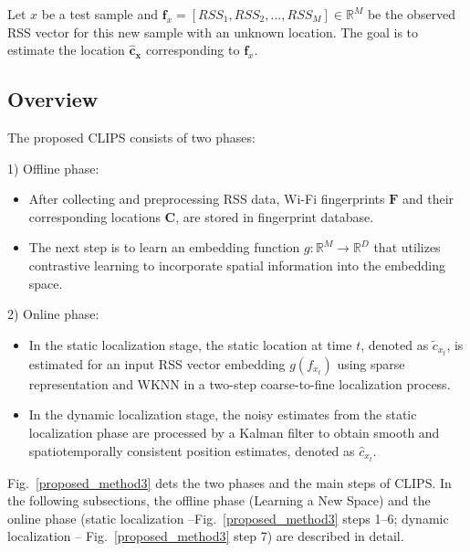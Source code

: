 \documentclass[journal,twoside,web]{ieeecolor}
\begin{document}
Let $x$ be a test sample and $\mathbf{f}_{x}= [RSS_1, RSS_2, ..., RSS_M] \in \mathbb{R}^{M}$ be the observed RSS vector for this new sample with an unknown location.
The goal is to estimate the location $\mathbf{\hat{c}_x}$ corresponding to $\mathbf{f}_{x}$.
\subsection{Overview}
The proposed CLIPS consists of two
phases:

1) Offline phase: 
\begin{itemize}
    \item After collecting and preprocessing RSS data, Wi-Fi fingerprints  
    \(\mathbf{F}\)  
    and their corresponding locations 
    \(\mathbf{C} \), are stored in fingerprint database.
    \item The next step is to learn an embedding function \( g: \mathbb{R}^M \to \mathbb{R}^D \) that utilizes contrastive learning to incorporate spatial information into the embedding space.
\end{itemize}
2) Online phase:
\begin{itemize}
    \item In the static localization stage, the static location at time \( t \), denoted as \( \tilde{c}_{x_t} \), is estimated for an input RSS vector embedding \( g(f_{x_t}) \) using sparse representation and WKNN in a two-step coarse-to-fine localization process.
    \item In the dynamic localization stage, the noisy estimates from the static localization phase are processed by a Kalman filter to obtain smooth and spatiotemporally consistent position estimates, denoted as \( \hat{c}_{x_t} \).
\end{itemize}
Fig.~\ref{proposed_method3} dets the
two phases and the main steps of CLIPS. In the following subsections, the offline phase (Learning a New Space) and the online phase (static localization –Fig.~\ref{proposed_method3} steps 1–6; dynamic localization – Fig.~\ref{proposed_method3} step 7) are described in detail.
\end{document}
